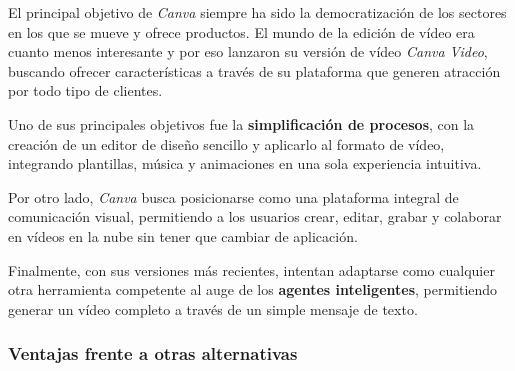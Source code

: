 El principal objetivo de \textit{Canva} siempre ha sido la democratización de los sectores en los que 
se mueve y ofrece productos. El mundo de la edición de vídeo era cuanto menos interesante y por eso 
lanzaron su versión de vídeo \textit{Canva Video}, buscando ofrecer características a través de su 
plataforma que generen atracción por todo tipo de clientes.

Uno de sus principales objetivos fue la \textbf{simplificación de procesos}, 
con la creación de un editor de diseño sencillo y aplicarlo al formato de vídeo, integrando 
plantillas, música y animaciones en una sola experiencia intuitiva.

Por otro lado, \textit{Canva} busca posicionarse como una plataforma integral de comunicación 
visual, permitiendo a los usuarios crear, editar, grabar y colaborar en vídeos en la nube sin 
tener que cambiar de aplicación.

Finalmente, con sus versiones más recientes, intentan adaptarse como cualquier otra herramienta 
competente al auge de los \textbf{agentes inteligentes}, permitiendo generar un vídeo completo 
a través de un simple mensaje de texto.

\subsubsection{Ventajas frente a otras alternativas}


